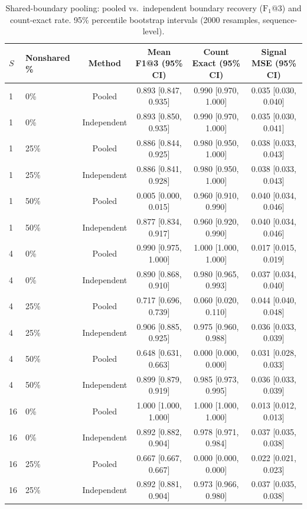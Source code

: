\begin{table}[!htbp]
\centering\small
\caption{Shared-boundary pooling: pooled vs.\ independent boundary recovery ($\mathrm{F_1}@3$) and count-exact rate. 95\% percentile bootstrap intervals (2000 resamples, sequence-level).}
\label{tab:planned-E04-paper}
\begin{tabular}{@{}llcccc@{}}
\toprule
$S$ & Nonshared \% & Method & Mean F1@3 (95\% CI) & Count Exact (95\% CI) & Signal MSE (95\% CI) \\
\midrule
1 & 0\% & Pooled & 0.893 [0.847, 0.935] & 0.990 [0.970, 1.000] & 0.035 [0.030, 0.040] \\
1 & 0\% & Independent & 0.893 [0.850, 0.935] & 0.990 [0.970, 1.000] & 0.035 [0.030, 0.041] \\
1 & 25\% & Pooled & 0.886 [0.844, 0.925] & 0.980 [0.950, 1.000] & 0.038 [0.033, 0.043] \\
1 & 25\% & Independent & 0.886 [0.841, 0.928] & 0.980 [0.950, 1.000] & 0.038 [0.033, 0.043] \\
1 & 50\% & Pooled & 0.005 [0.000, 0.015] & 0.960 [0.910, 0.990] & 0.040 [0.034, 0.046] \\
1 & 50\% & Independent & 0.877 [0.834, 0.917] & 0.960 [0.920, 0.990] & 0.040 [0.034, 0.046] \\
4 & 0\% & Pooled & 0.990 [0.975, 1.000] & 1.000 [1.000, 1.000] & 0.017 [0.015, 0.019] \\
4 & 0\% & Independent & 0.890 [0.868, 0.910] & 0.980 [0.965, 0.993] & 0.037 [0.034, 0.040] \\
4 & 25\% & Pooled & 0.717 [0.696, 0.739] & 0.060 [0.020, 0.110] & 0.044 [0.040, 0.048] \\
4 & 25\% & Independent & 0.906 [0.885, 0.925] & 0.975 [0.960, 0.988] & 0.036 [0.033, 0.039] \\
4 & 50\% & Pooled & 0.648 [0.631, 0.663] & 0.000 [0.000, 0.000] & 0.031 [0.028, 0.033] \\
4 & 50\% & Independent & 0.899 [0.879, 0.919] & 0.985 [0.973, 0.995] & 0.036 [0.033, 0.039] \\
16 & 0\% & Pooled & 1.000 [1.000, 1.000] & 1.000 [1.000, 1.000] & 0.013 [0.012, 0.013] \\
16 & 0\% & Independent & 0.892 [0.882, 0.904] & 0.978 [0.971, 0.984] & 0.037 [0.035, 0.038] \\
16 & 25\% & Pooled & 0.667 [0.667, 0.667] & 0.000 [0.000, 0.000] & 0.022 [0.021, 0.023] \\
16 & 25\% & Independent & 0.892 [0.881, 0.904] & 0.973 [0.966, 0.980] & 0.037 [0.035, 0.038] \\

\end{tabular}
\end{table}
